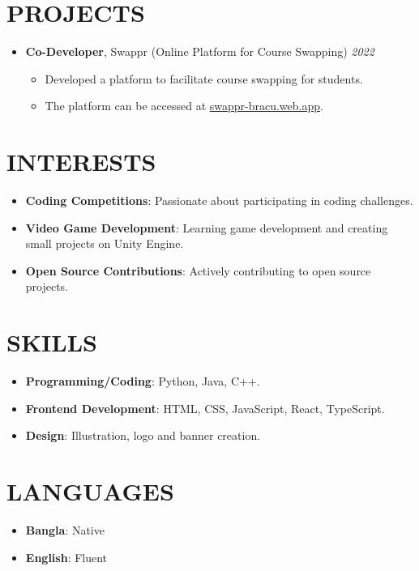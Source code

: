 \documentclass[a4paper,10pt]{article}
\begin{document}
\section*{\normalsize PROJECTS}
\begin{itemize}[leftmargin=0.2in, label={}]
    \item \textbf{Co-Developer}, Swappr (Online Platform for Course Swapping) \hfill \textit{2022} \\
    \vspace{-0.8em}
    \begin{itemize}[leftmargin=0.2in, label={--}]
        \item Developed a platform to facilitate course swapping for students.
        \vspace{0.5em}
        \item The platform can be accessed at \href{https://swappr-bracu.web.app}{swappr-bracu.web.app}.
    \end{itemize}
\end{itemize}

\section*{\normalsize INTERESTS}
\begin{itemize}[leftmargin=0in, label={}]
    \item \textbf{Coding Competitions}: Passionate about participating in coding challenges.
    \vspace{0.5em}
    \item \textbf{Video Game Development}: Learning game development and creating small projects on Unity Engine.
    
    \vspace{0.5em}
    
    \item \textbf{Open Source Contributions}: Actively contributing to open source projects.
\end{itemize}

\section*{\normalsize SKILLS}
\begin{itemize}[leftmargin=0.2in, label={}]
    \item \textbf{Programming/Coding}: Python, Java, C++.
    \vspace{0.5em}
    \item \textbf{Frontend Development}: HTML, CSS, JavaScript, React, TypeScript.
    
    \vspace{0.5em}
    
    \item \textbf{Design}: Illustration, logo and banner creation.
\end{itemize}

\section*{\normalsize LANGUAGES}
\begin{itemize}[leftmargin=0.2in, label={}]
    \item \textbf{Bangla}: Native
    \vspace{0.5em}
    \item \textbf{English}: Fluent
\end{itemize}
\end{document}
